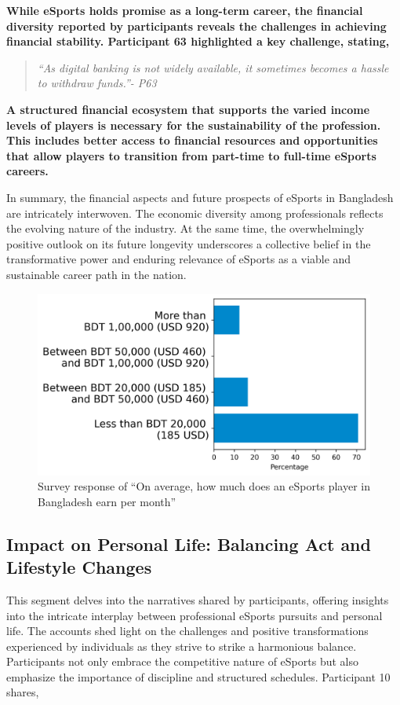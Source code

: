 \documentclass[manuscript,screen,review,anonymous]{acmart}
\begin{document}
\textbf{While eSports holds promise as a long-term career, the financial diversity reported by participants reveals the challenges in achieving financial stability. Participant 63 highlighted a key challenge, stating,}

\begin{quote}
    {\emph{``As digital banking is not widely available, it sometimes becomes a hassle to withdraw funds.''- P63}}
\end{quote}

\textbf{A structured financial ecosystem that supports the varied income levels of players is necessary for the sustainability of the profession. This includes better access to financial resources and opportunities that allow players to transition from part-time to full-time eSports careers.}

In summary, the financial aspects and future prospects of eSports in Bangladesh are intricately interwoven. The economic diversity among professionals reflects the evolving nature of the industry. At the same time, the overwhelmingly positive outlook on its future longevity underscores a collective belief in the transformative power and enduring relevance of eSports as a viable and sustainable career path in the nation.

\begin{figure}[h]
  \centering
  \includegraphics[width=0.4\columnwidth]{EA4.png}
  \caption{Survey response of ``On average, how much does an eSports player in Bangladesh earn per month''}
  \label{fig:earning}
\end{figure}

\subsection{Impact on Personal Life: Balancing Act and Lifestyle Changes}

This segment delves into the narratives shared by participants, offering insights into the intricate interplay between professional eSports pursuits and personal life. The accounts shed light on the challenges and positive transformations experienced by individuals as they strive to strike a harmonious balance. Participants not only embrace the competitive nature of eSports but also emphasize the importance of discipline and structured schedules. Participant 10 shares, 
\end{document}
